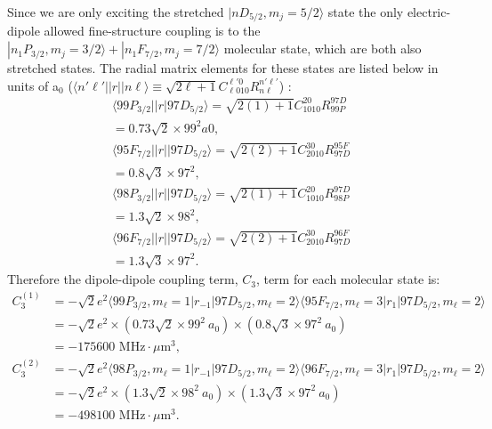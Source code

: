 Since we are only exciting the stretched $|nD_{5/2},m_j=5/2\rangle$ state the only electric-dipole allowed fine-structure coupling is to the $|n_1P_{3/2},m_j=3/2\rangle + |n_1F_{7/2},m_j=7/2\rangle$ molecular state, which are both also stretched states.
The radial matrix elements for these states are listed below in units of a${_0}$ ($\langle n'\ell '||r||n\ell\rangle \equiv \sqrt{2\ell +1}C^{\ell '0}_{\ell 010}R^{n'\ell '}_{n\ell}$) \cite{WS2007}:
\begin{subequations}
  \label{eq_dradmatelem}
  \begin{align}
  \langle 99P_{3/2}||r|97D_{5/2} \rangle
	=\sqrt{2(1)+1}C^{20}_{1010}R^{97D}_{99P}\\
	=0.73\sqrt{2}\times 99^2 a0,\\
    \langle 95F_{7/2}||r||97D_{5/2} \rangle 
	=\sqrt{2(2)+1}C^{30}_{2010}R^{95F}_{97D}\\
	=0.8\sqrt{3}\times 97^2,\\
    \langle 98P_{3/2}||r||97D_{5/2} \rangle 
	=\sqrt{2(1)+1}C^{20}_{1010}R^{97D}_{98P}\\
	= 1.3\sqrt{2}\times 98^2,\\
    \langle 96F_{7/2}||r||97D_{5/2}\rangle 
	=\sqrt{2(2)+1}C^{30}_{2010}R^{96F}_{97D}\\
	= 1.3\sqrt{3}\times 97^2.
  \end{align}
\end{subequations}
Therefore the dipole-dipole coupling term, $C_3$, term for each molecular state is:
\begin{equation}
  \label{eq_dc3s}
  \begin{split}
    C_3^{(1)} 
      &= -\sqrt{2}e^2 \langle 99P_{3/2}, m_{\ell}=1|r_{-1}|97D_{5/2}, m_{\ell}=2\rangle \langle 95F_{7/2}, m_{\ell}=3|r_1|97D_{5/2}, m_{\ell}=2\rangle\\
      &= -\sqrt{2}e^2 \times (0.73\sqrt{2}\times 99^2 \ a_0) \times (0.8\sqrt{3}\times 97^2 \ a_0) \\
      &=-175600 \text{ MHz} \cdot \mu \text{m}^3,\\
    C_3^{(2)} 
      &= -\sqrt{2}e^2 \langle 98P_{3/2},m_{\ell}=1|r_{-1}|97D_{5/2},m_{\ell}=2\rangle \langle 96F_{7/2},m_{\ell}=3|r_1|97D_{5/2},m_{\ell}=2\rangle\\ 
      &= -\sqrt{2}e^2 \times (1.3\sqrt{2}\times 98^2 \ a_0) \times (1.3\sqrt{3}\times 97^2 \ a_0) \\
      &=-498100 \text{ MHz} \cdot \mu \text{m}^3.
  \end{split}
\end{equation}


